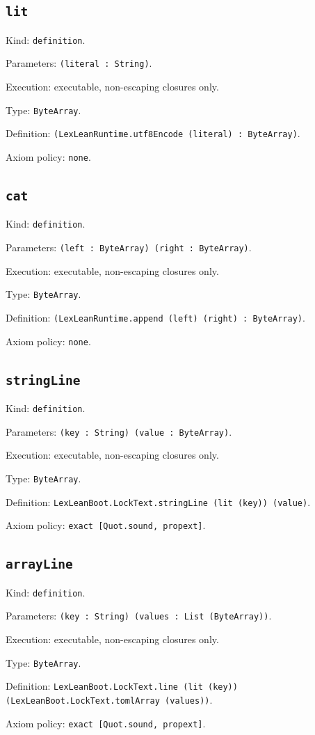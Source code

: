 \documentclass[11pt]{article}
\begin{document}
\subsection*{\texttt{lit}}
\noindent Kind: \texttt{definition}.\par
\noindent Parameters: \texttt{(literal : String)}.\par
\noindent Execution: executable, non-escaping closures only.\par
\noindent Type: \texttt{ByteArray}.\par
\noindent Definition: \texttt{(LexLeanRuntime.utf8Encode (literal) : ByteArray)}.\par
\noindent Axiom policy: \texttt{none}.\par
\subsection*{\texttt{cat}}
\noindent Kind: \texttt{definition}.\par
\noindent Parameters: \texttt{(left : ByteArray) (right : ByteArray)}.\par
\noindent Execution: executable, non-escaping closures only.\par
\noindent Type: \texttt{ByteArray}.\par
\noindent Definition: \texttt{(LexLeanRuntime.append (left) (right) : ByteArray)}.\par
\noindent Axiom policy: \texttt{none}.\par
\subsection*{\texttt{stringLine}}
\noindent Kind: \texttt{definition}.\par
\noindent Parameters: \texttt{(key : String) (value : ByteArray)}.\par
\noindent Execution: executable, non-escaping closures only.\par
\noindent Type: \texttt{ByteArray}.\par
\noindent Definition: \texttt{LexLeanBoot.LockText.stringLine (lit (key)) (value)}.\par
\noindent Axiom policy: \texttt{exact [Quot.sound, propext]}.\par
\subsection*{\texttt{arrayLine}}
\noindent Kind: \texttt{definition}.\par
\noindent Parameters: \texttt{(key : String) (values : List (ByteArray))}.\par
\noindent Execution: executable, non-escaping closures only.\par
\noindent Type: \texttt{ByteArray}.\par
\noindent Definition: \texttt{LexLeanBoot.LockText.line (lit (key)) (LexLeanBoot.LockText.tomlArray (values))}.\par
\noindent Axiom policy: \texttt{exact [Quot.sound, propext]}.\par
\end{document}
